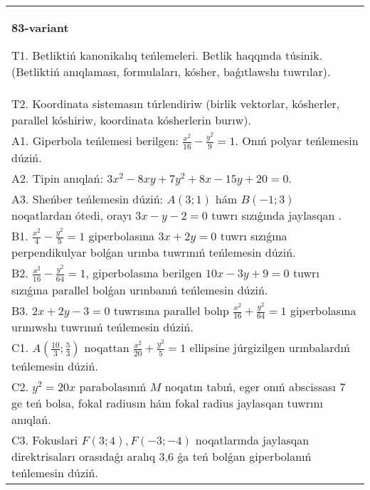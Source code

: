 \documentclass{article}
\begin{document}
\begin{tabular}{m{17cm}}
\textbf{83-variant}
\newline

T1. Betliktiń kanonikalıq teńlemeleri. Betlik haqqında túsinik. (Betliktiń anıqlaması, formulaları, kósher, baǵıtlawshı tuwrılar).\\

T2. Koordinata sistemasın túrlendiriw (birlik vektorlar, kósherler, parallel kóshiriw, koordinata kósherlerin burıw).\\

A1. Giperbola teńlemesi berilgen: $\frac{x^{2}}{16}-\frac{y^{2}}{9}=1$. Onıń polyar teńlemesin dúziń.\\

A2. Tipin anıqlań: $3 x^{2}-8 xy+7 y^{2}+8 x-15 y+20=0$.\\

A3. Sheńber teńlemesin dúziń: $A (3;1) $ hám $B (-1;3) $ noqatlardan ótedi, orayı $3 x-y-2=0$ tuwrı sızıǵında jaylasqan .\\

B1. $\frac{x^{2}}{4} - \frac{y^{2}}{5} = 1$ giperbolasına $3x + 2y = 0$ tuwrı sızıǵına perpendikulyar bolǵan urınba tuwrınıń teńlemesin dúziń.\\

B2. $\frac{x^{2}}{16} - \frac{y^{2}}{64} = 1$, giperbolasına berilgen $10x - 3y + 9 = 0$ tuwrı sızıǵına parallel bolǵan urınbanıń teńlemesin dúziń.  \\

B3. $2x + 2y - 3 = 0$ tuwrısına parallel bolıp $\frac{x^{2}}{16} + \frac{y^{2}}{64} = 1$ giperbolasına urınıwshı tuwrınıń teńlemesin dúziń.  \\

C1. $A(\frac{10}{3};\frac{5}{3})$ noqattan $\frac{x^{2}}{20} + \frac{y^{2}}{5} = 1$ ellipsine júrgizilgen urınbalardıń teńlemesin dúziń.  \\

C2. $y^{2} = 20x$ parabolasınıń $M$ noqatın tabıń, eger onıń abscissası 7 ge teń bolsa, fokal radiusın hám fokal radius jaylasqan tuwrını anıqlań.\\

C3. Fokuslari $F(3;4), F(-3;-4)$ noqatlarında jaylasqan direktrisaları orasıdaǵı aralıq 3,6 ǵa teń bolǵan giperbolanıń teńlemesin dúziń.  \\

\end{tabular}
\vspace{1cm}
\end{document}
